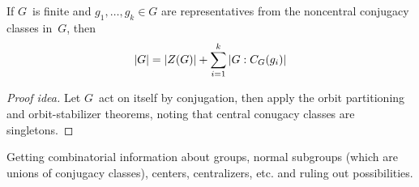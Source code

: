 \begin{thm}
If \(G\)~is finite and \(g_1,\ldots,g_k\in G\) are representatives from the noncentral conjugacy classes in~\(G\), then
\[\ord{G}=\ord{Z(G)}+\sum_{i=1}^k\idx{C_G(g_i)}{G}\]
\end{thm}
\begin{proof}[Proof idea]
Let \(G\)~act on itself by conjugation, then apply the orbit partitioning and orbit-stabilizer theorems, noting that central conugacy classes are singletons.
\end{proof}
\begin{app}
Getting combinatorial information about groups, normal subgroups (which are unions of conjugacy classes), centers, centralizers, etc. and ruling out possibilities.
\end{app}

